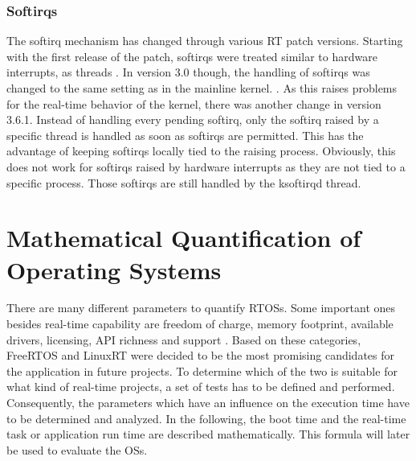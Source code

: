 \subsubsection{Softirqs}
The softirq mechanism has changed through various \ac{RT} patch versions.
Starting with the first release of the patch, softirqs were treated similar to hardware interrupts, as threads \cite{rostedt:iotrtp}.
In version 3.0 though, the handling of softirqs was changed to the same setting as in the mainline kernel. \cite{corbet:siar}.
As this raises problems for the real-time behavior of the kernel, there was another change in version 3.6.1.
Instead of handling every pending softirq, only the softirq raised by a specific thread is handled as soon as softirqs are permitted. 
This has the advantage of keeping softirqs locally tied to the raising process.
Obviously, this does not work for softirqs raised by hardware interrupts as they are not tied to a specific process.
Those softirqs are still handled by the ksoftirqd thread.

\section{Mathematical Quantification of Operating Systems}
There are many different parameters to quantify \acp{RTOS}.
Some important ones besides real-time capability are freedom of charge, memory footprint, available drivers, licensing, \ac{API} richness and support \cite{Anh:sapeortosfsm}.   
Based on these categories, FreeRTOS and LinuxRT were decided to be the most promising candidates for the application in future projects.
To determine which of the two is suitable for what kind of real-time projects, a set of tests has to be defined and performed.
Consequently, the parameters which have an influence on the execution time have to be determined and analyzed.
In the following, the boot time and the real-time task or application run time are described mathematically.
This formula will later be used to evaluate the \acp{OS}.

